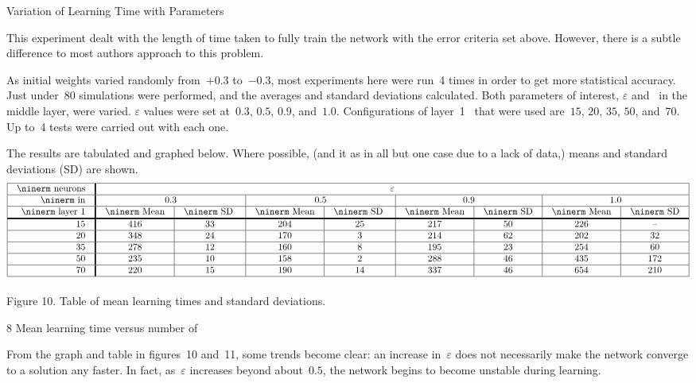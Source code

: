 \sec Variation of Learning Time with Parameters

This experiment dealt with the length of time taken to fully train
the network with the error criteria set above.
However, there is a subtle difference to most authors approach to
this problem.

As initial weights varied randomly from~$+0.3$ to~$-0.3$, most experiments 
here were run~4 times in order to get more statistical accuracy.
Just under~80 simulations were performed, and the averages and standard
deviations calculated.
Both parameters of interest, $\varepsilon$ and \neus\ in the middle
layer, were varied.
$\varepsilon$ values were set at~$0.3$, $0.5$, $0.9$, and~$1.0$.
Configurations of layer~1 \neus\ that were used 
are~$15$, $20$, $35$, $50$, and~$70$.
Up to~4 tests were carried out with each one.

The results are tabulated and graphed below.
Where possible, (and it as in all but one case due to a lack of
data,) means and standard deviations (SD) are shown.
$$
\vbox{\tabskip=0pt \offinterlineskip
\def\tablerule{\noalign{\hrule}}
\halign{\strut#& \vrule#\tabskip=1em plus2em&
 \hfil#& \vrule width1.5pt#&
 \hfil#\hfil& \vrule#&
 \hfil#\hfil& \vrule#&
 \hfil#\hfil& \vrule#&
 \hfil#\hfil& \vrule#&
 \hfil#\hfil& \vrule#&
 \hfil#\hfil& \vrule#&
 \hfil#\hfil& \vrule#&
 \hfil#\hfil& \vrule#\tabskip=0pt\cr
\tablerule
&&{\ninerm neurons}&&\multispan{15}\hfil$\varepsilon$\hfil&\cr
\tablerule
&&{\ninerm in}&&\multispan3\hfil 0.3\hfil&&\multispan3\hfil 0.5\hfil&&
 \multispan3\hfil 0.9\hfil&&\multispan3\hfil 1.0\hfil&\cr
\tablerule
&&{\ninerm layer 1}&&{\ninerm Mean}&&{\ninerm SD}
 &&{\ninerm Mean}&&{\ninerm SD}
 &&{\ninerm Mean}&&{\ninerm SD}&&{\ninerm Mean}&&{\ninerm SD}&\cr
\noalign{\hrule height1.5pt}
&&15&&416&&33&&204&&25&&217&&50&&226&&--&\cr
\tablerule
&&20&&348&&24&&170&&3&&214&&62&&202&&32&\cr
\tablerule
&&35&&278&&12&&160&&8&&195&&23&&254&&60&\cr
\tablerule
&&50&&235&&10&&158&&2&&288&&46&&435&&172&\cr
\tablerule
&&70&&220&&15&&190&&14&&337&&46&&654&&210&\cr
\tablerule
}}
$$
\centerline{Figure 10. Table of mean learning times and standard deviations.}

 {8} {Mean learning time versus number of \neus}

From the graph and table in figures~10 and~11, some trends become
clear: an increase in~$\varepsilon$ does not necessarily make the
network converge to a solution any faster.
In fact, as~$\varepsilon$ increases beyond about~$0.5$, the network
begins to become unstable during learning.

